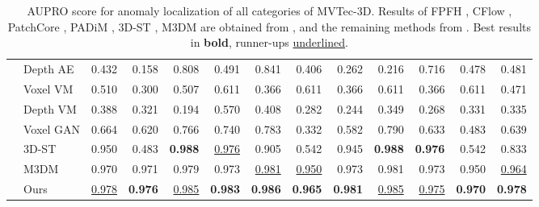 \begin{table}[ht]
\begin{tabular}{cl|r|r|r|r|r|r|r|r|r|r|r}
& Depth AE & 0.432 & 0.158 & 0.808 & 0.491 & 0.841 & 0.406 & 0.262 & 0.216 & 0.716 & 0.478 & 0.481 \\
& Voxel VM & 0.510 & 0.300 & 0.507 & 0.611 & 0.366 & 0.611 & 0.366 & 0.611 & 0.366 & 0.611 & 0.471 \\
& Depth VM & 0.388 & 0.321 & 0.194 & 0.570 & 0.408 & 0.282 & 0.244 & 0.349 & 0.268 & 0.331 & 0.335 \\
& Voxel GAN & 0.664 & 0.620 & 0.766 & 0.740 & 0.783 & 0.332 & 0.582 & 0.790 & 0.633 & 0.483 & 0.639 \\
& 3D-ST & 0.950 & 0.483 & \textbf{0.988} & \underline{0.976} & 0.905 & 0.542 & 0.945 & \textbf{0.988} & \textbf{0.976} & 0.542 & 0.833 \\
& M3DM & 0.970 & 0.971 & 0.979 & 0.973 & \underline{0.981} & \underline{0.950} & 0.973 & 0.981 & 0.973 & 0.950 & \underline{0.964} \\
& Ours & \underline{0.978} & \textbf{0.976} & \underline{0.985} & \textbf{0.983} & \textbf{0.986} & \textbf{0.965} & \textbf{0.981} & \underline{0.985} & \underline{0.975} & \textbf{0.970} & \textbf{0.978} \\
\hline
\end{tabular}
\caption{\label{tab:2} AUPRO score for anomaly localization of all categories of MVTec-3D. Results of FPFH \cite{horwitz2022empirical}, CFlow \cite{gudovskiy2022cflow}, PatchCore \cite{roth2022towards}, PADiM \cite{defard2021padim}, 3D-ST \cite{bergmann2023anomaly}, M3DM \cite{wang2023multimodal} are obtained from \cite{wang2023multimodal}, and the remaining methods from \cite{bergmann2022mvtec}. Best results in \textbf{bold}, runner-ups \underline{underlined}.}
\end{table}

